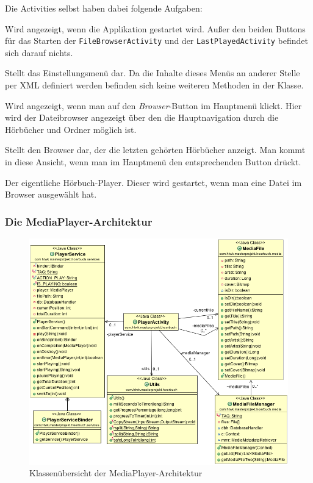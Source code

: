 Die Activities selbst haben dabei folgende Aufgaben:

\begin{description}[style=nextline]
	\item[MainActivity] Wird angezeigt, wenn die Applikation gestartet wird. Außer den beiden Buttons für das Starten der \verb+FileBrowserActivity+ und der \verb+LastPlayedActivity+ befindet sich darauf nichts.
	\item[SettingsActivity] Stellt das Einstellungsmenü dar. Da die Inhalte dieses Menüs an anderer Stelle per XML definiert werden befinden sich keine weiteren Methoden in der Klasse.
	\item[FileBrowserActivity] Wird angezeigt, wenn man auf den \emph{Browser}-Button im Hauptmenü klickt. Hier wird der Dateibrowser angezeigt über den die Hauptnavigation durch die Hörbücher und Ordner möglich ist.
	\item[LastPlayedActivity] Stellt den Browser dar, der die letzten gehörten Hörbücher anzeigt. Man kommt in diese Ansicht, wenn man im Hauptmenü den entsprechenden Button drückt.
	\item[PlayerActivity] Der eigentliche Hörbuch-Player. Dieser wird gestartet, wenn man eine Datei im Browser ausgewählt hat.
\end{description}

\subsubsection{Die MediaPlayer-Architektur}

\begin{figure}[ht!]
\begin{center}
\includegraphics[scale=.5]{images/cd_media}
\caption{Klassenübersicht der MediaPlayer-Architektur}
\label{cd_media}
\end{center}
\end{figure}


